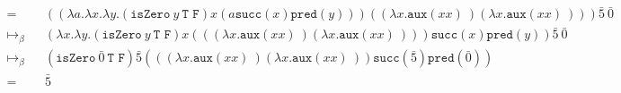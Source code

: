 \documentclass[11pt]{article}
\begin{document}
\begin{enumerate}
\begin{align*}
		      =             &  & (( \lambda a. \lambda x. \lambda y. ( \texttt{isZero} \: y \: \texttt{T F}) x ( a \texttt{succ}(x) \texttt{pred}(y)))(( \lambda x. \texttt{aux}(x x) \:)( \lambda x. \texttt{aux}(x x) \:))) \bar{5} \: \bar{0} & \\ \mapsto_\beta &  & ( \lambda x. \lambda y. ( \texttt{isZero} \: y \: \texttt{T F}) x ((( \lambda x. \texttt{aux}(x x) \:)( \lambda x. \texttt{aux}(x x) \:))) \texttt{succ}(x) \texttt{pred}(y)) \bar{5} \: \bar{0}                & \\
		      \mapsto_\beta &  & ( \texttt{isZero} \: \bar{0}  \: \texttt{T F}) \bar{5} ((( \lambda x. \texttt{aux}(x x) \:)( \lambda x. \texttt{aux}(x x) \:)) \texttt{succ}( \bar{5} ) \texttt{pred}( \bar{0} ))                               & \\
		      =             &  & \bar{5}
	      \end{align*}

\end{enumerate}
\end{document}
